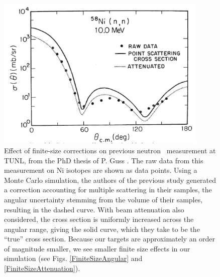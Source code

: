 \begin{figure}[ht!]
    \begin{center}
        \includegraphics[width=0.9\textwidth, trim={0 0.1cm 0 0}, clip]{figures/GussFiniteSizeEffect.png}
        \caption[Effect of finite-size corrections on previous neutron \el\ measurement at
        TUNL]
        {
            Effect of finite-size corrections on previous neutron \el\ measurement at
            TUNL, from the PhD thesis of P. Guss \cite{GussPhDThesis}.
            The raw data from this measurement on Ni isotopes are shown as data
            points. Using a Monte Carlo simulation, the authors of the previous
            study generated a correction accounting for multiple scattering in
            their samples, the angular uncertainty stemming from the volume
            of their samples, resulting in the dashed curve. With beam
            attenuation also considered, the cross section is uniformly
            increased across the angular range, giving the solid curve, which
            they take to be the ``true'' cross section. Because our targets are
            approximately an order of magnitude smaller, we see smaller
            finite size effects in our simulation (see Figs.
            \ref{FiniteSizeAngular} and \ref{FiniteSizeAttenuation}).
        }
        \label{GussFiniteSizeEffect}
    \end{center}
\end{figure}

